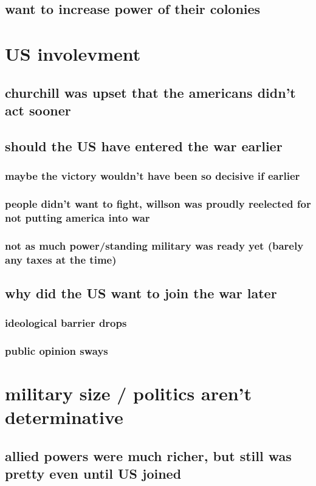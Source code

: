 \documentclass[letterpaper]{article}
\begin{document}
\subsection{want to increase power of their colonies}
\label{sec:org263e653}
\section{US involevment}
\label{sec:orgb67030c}
\subsection{churchill was upset that the americans didn't act sooner}
\label{sec:orga29471e}
\subsection{should the US have entered the war earlier}
\label{sec:orgaa1a6d5}
\subsubsection{maybe the victory wouldn't have been so decisive if earlier}
\label{sec:orgc31a6a2}
\subsubsection{people didn't want to fight, willson was proudly reelected for not putting america into war}
\label{sec:orge525324}
\subsubsection{not as much power/standing military was ready yet (barely any taxes at the time)}
\label{sec:org9082bf2}
\subsection{why did the US want to join the war later}
\label{sec:orgb0242a1}
\subsubsection{ideological barrier drops}
\label{sec:orgc8cac07}
\subsubsection{public opinion sways}
\label{sec:org3debb2d}
\section{military size / politics aren't determinative}
\label{sec:orgfcfed03}
\subsection{allied powers were much richer, but still was pretty even until US joined}
\label{sec:org70a4c03}
\end{document}
